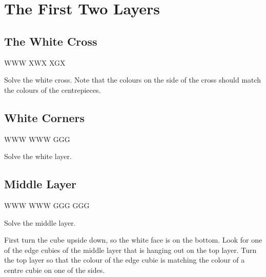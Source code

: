 \documentclass{article}
\begin{document}
    \section{The First Two Layers}

    \subsection{The White Cross}

    \RubikCubeGreyWY
     {W}{W}{W} {X}{W}{X}
     {X}{G}{X}

    \begin{goal}
        Solve the white cross.
        Note that the colours on the side of the cross should match the colours of the centrepieces.
    \end{goal}


    \subsection{White Corners}

    \RubikCubeGreyWY
     {W}{W}{W} {W}{W}{W}
     {G}{G}{G}

    \begin{goal}
        Solve the white layer.
    \end{goal}


    \subsection{Middle Layer}

    \RubikCubeGreyWY
     {W}{W}{W} {W}{W}{W}
     {G}{G}{G}
     {G}{G}{G}

    \begin{goal}
        Solve the middle layer.
    \end{goal}

    First turn the cube upside down, so the white face is on the bottom.
    Look for one of the edge cubies of the middle layer that is hanging out on the top layer.
    Turn the top layer so that the colour of the edge cubie is matching the colour of a centre cubie on one of the sides.

\end{document}
